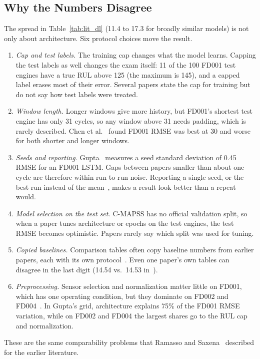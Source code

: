\subsection{Why the Numbers Disagree}
The spread in Table~\ref{tab:lit_dl} (11.4 to 17.3 for broadly similar models)
is not only about architecture. Six protocol choices move the result.
\begin{enumerate}
\item \emph{Cap and test labels.} The training cap changes what the model
learns. Capping the test labels as well changes the exam itself: 11 of the
100 FD001 test engines have a true RUL above 125 (the maximum is 145), and a
capped label erases most of their error. Several papers state the cap for
training but do not say how test labels were treated.
\item \emph{Window length.} Longer windows give more history, but FD001's
shortest test engine has only 31 cycles, so any window above 31 needs padding,
which is rarely described. Chen et al.~\cite{Chen2021machine} found FD001
RMSE was best at 30 and worse for both shorter and longer windows.
\item \emph{Seeds and reporting.} Gupta~\cite{Gupta2026auditing} measures a
seed standard deviation of 0.45 RMSE for an FD001 LSTM. Gaps between papers
smaller than about one cycle are therefore within run-to-run noise. Reporting
a single seed, or the best run instead of the mean~\cite{Sharma2025uncertainty},
makes a result look better than a repeat would.
\item \emph{Model selection on the test set.} C-MAPSS has no official
validation split, so when a paper tunes architecture or epochs on the test
engines, the test RMSE becomes optimistic. Papers rarely say which split
was used for tuning.
\item \emph{Copied baselines.} Comparison tables often copy baseline numbers
from earlier papers, each with its own protocol~\cite{Zhang2022dual,Jin2022bilstm}.
Even one paper's own tables can disagree in the last digit (14.54 vs.\ 14.53
in~\cite{Chen2021machine}).
\item \emph{Preprocessing.} Sensor selection and normalization matter little
on FD001, which has one operating condition, but they dominate on FD002 and
FD004~\cite{Gupta2026auditing}. In Gupta's grid, architecture explains 75\% of
the FD001 RMSE variation, while on FD002 and FD004 the largest shares go to
the RUL cap and normalization.
\end{enumerate}
These are the same comparability problems that Ramasso and
Saxena~\cite{Ramasso2014performance} described for the earlier literature.

